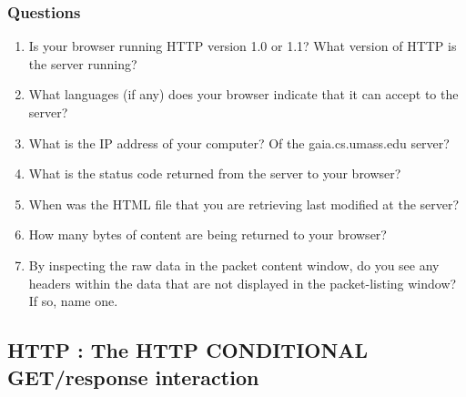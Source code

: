     \subsubsection*{Questions}
        \begin{enumerate}[label=\bfseries Problem \arabic*:,leftmargin=*,labelindent=1em]
            \item Is your browser running HTTP version 1.0 or 1.1? What version of HTTP is the server running?\\[0.2mm]
            \soln 
            
            \item What languages (if any) does your browser indicate that it can accept to the server?\\[0.2mm]
            \soln
            
            \item What is the IP address of your computer? Of the gaia.cs.umass.edu server? \\[0.2mm]
            \soln
            
            \item What is the status code returned from the server to your browser?\\[0.2mm]
            \soln 
            
            \item When was the HTML file that you are retrieving last modified at the server? \\[0.2mm]
            \soln
            
            \item How many bytes of content are being returned to your browser? \\[0.2mm]
            \soln
            
            \item By inspecting the raw data in the packet content window, 
            do you see any headers within the data that are not displayed in the packet-listing window?
            If so, name one.\\[0.2mm]
            \soln
            
        \end{enumerate}
\subsection{HTTP : The HTTP CONDITIONAL GET/response interaction}
